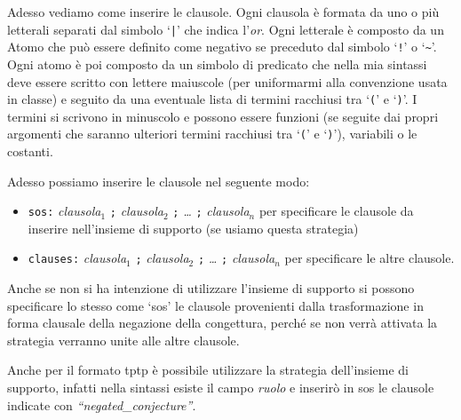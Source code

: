 \documentclass[a4paper,11pt]{article} %
\newcommand{\sintassi}{\texttt}
\begin{document}
Adesso vediamo come inserire le clausole. %
Ogni clausola è formata da uno o più letterali separati dal simbolo `\sintassi{|}'
che indica l'\emph{or}. Ogni letterale è composto da un Atomo che può essere definito
come negativo se preceduto dal simbolo `\sintassi{!}' o `\sintassi{\~}'. Ogni atomo
è poi composto da un simbolo di predicato che nella mia sintassi 
deve essere scritto con lettere maiuscole
(per uniformarmi alla convenzione usata in classe) 
e seguito da una eventuale lista di termini racchiusi tra `\sintassi{(}' e `\sintassi{)}'.
I termini si scrivono in minuscolo e possono essere funzioni (se seguite dai propri
argomenti che saranno ulteriori termini racchiusi tra `\sintassi{(}' e `\sintassi{)}'),
 variabili o le costanti.%

Adesso possiamo inserire le clausole nel seguente modo:
\vspace{-1ex}
\begin{itemize}
  \item{\sintassi{sos:} \emph{clausola$_1$} \sintassi{;} 
  \emph{clausola$_2$} \sintassi{;} \emph{\ldots} \sintassi{;} \emph{clausola$_n$}}
  per specificare le clausole da inserire nell'insieme di supporto (se usiamo questa strategia)
\vspace{-1ex}
  \item{\sintassi{clauses:} \emph{clausola$_1$} \sintassi{;} 
  \emph{clausola$_2$} \sintassi{;} \emph{\ldots} \sintassi{;} \emph{clausola$_n$}}
  per specificare le altre clausole.
\end{itemize}
\vspace{-1ex}
Anche se non si ha intenzione di utilizzare l'insieme di supporto si possono
specificare lo stesso come `sos' le clausole provenienti dalla trasformazione in
forma clausale della negazione della congettura, perché se non verrà attivata la
strategia verranno unite alle altre clausole.

Anche per il formato tptp è possibile utilizzare la strategia dell'insieme di 
supporto, infatti nella sintassi esiste il campo \emph{ruolo} %
e inserirò in sos le clausole indicate con \emph{``negated\_conjecture''}.
\end{document}
